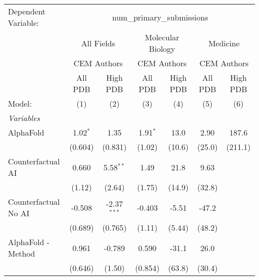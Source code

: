 \begingroup
\centering
\begin{tabular}{lcccccc}
   \tabularnewline \midrule \midrule
   Dependent Variable: & \multicolumn{6}{c}{num\_primary\_submissions}\\
 & \multicolumn{2}{c}{All Fields} & \multicolumn{2}{c}{Molecular Biology} & \multicolumn{2}{c}{Medicine} \\
\cmidrule(lr){2-3} \cmidrule(lr){4-5} \cmidrule(lr){6-7}
 & \multicolumn{2}{c}{CEM Authors} & \multicolumn{2}{c}{CEM Authors} & \multicolumn{2}{c}{CEM Authors} \\
\cmidrule(lr){2-3} \cmidrule(lr){4-5} \cmidrule(lr){6-7}
 & \multicolumn{1}{c}{All PDB} & \multicolumn{1}{c}{High PDB} & \multicolumn{1}{c}{All PDB} & \multicolumn{1}{c}{High PDB} & \multicolumn{1}{c}{All PDB} & \multicolumn{1}{c}{High PDB} \\
\cmidrule(lr){2-2} \cmidrule(lr){3-3} \cmidrule(lr){4-4} \cmidrule(lr){5-5} \cmidrule(lr){6-6} \cmidrule(lr){7-7}
   Model:                                                     & (1)         & (2)           & (3)        & (4)     & (5)    & (6)\\  
   \midrule
   \emph{Variables}\\
   AlphaFold                                                  & 1.02$^{*}$  & 1.35          & 1.91$^{*}$ & 13.0    & 2.90   & 187.6\\   
                                                              & (0.604)     & (0.831)       & (1.02)     & (10.6)  & (25.0) & (211.1)\\   
   Counterfactual AI                                          & 0.660       & 5.58$^{**}$   & 1.49       & 21.8    & 9.63   &   \\   
                                                              & (1.12)      & (2.64)        & (1.75)     & (14.9)  & (32.8) &   \\   
   Counterfactual No AI                                       & -0.508      & -2.37$^{***}$ & -0.403     & -5.51   & -47.2  &   \\   
                                                              & (0.689)     & (0.765)       & (1.11)     & (5.44)  & (48.2) &   \\   
   AlphaFold - Method                                         & 0.961       & -0.789        & 0.590      & -31.1   & 26.0   &   \\   
                                                              & (0.646)     & (1.50)        & (0.854)    & (63.8)  & (30.4) &   \\   

\end{tabular}
